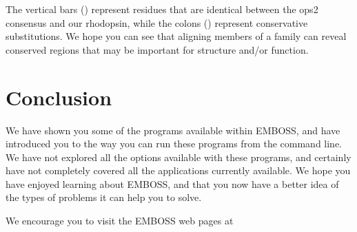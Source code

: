 \documentclass[12pt]{report}
\begin{document}
The vertical bars (\type{|}) represent residues that are identical
between the ops2 consensus and our rhodopsin, while the colons
(\type{:}) represent conservative substitutions. We hope you can see
that aligning members of a family can reveal conserved regions that
may be important for structure and/or function.

\chapter{Conclusion}
We have shown you some of the programs available within EMBOSS, and
have introduced you to the way you can run these programs from the
command line. We have not explored all the options available with
these programs, and certainly have not completely covered all the
applications currently available. We hope you have enjoyed learning
about EMBOSS, and that you now have a better idea of the types of
problems it can help you to solve.

We encourage you to visit the EMBOSS web pages at \\





\end{document}
